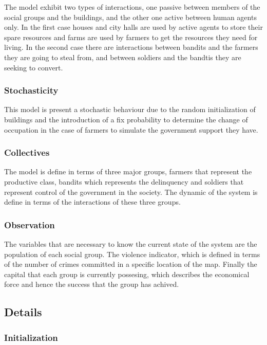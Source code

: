 \documentclass{wscpaperproc}
\begin{document}
The model exhibit two types of interactions, one passive between members of the
social groups and the buildings, and the other one active between human agents
only. In the first case houses and city halls are used by active agents to
store their spare resources and farms are used by farmers to get the resources
they need for living. In the second case there are interactions between
bandits and the farmers they are going to steal from, and between soldiers and
the bandtis they are seeking to convert.

\subsubsection{Stochasticity}

This model is present a stochastic behaviour due to the random initialization of
buildings and the introduction of a fix probability to determine the change of
occupation in the case of farmers to simulate the government support they have.

\subsubsection{Collectives}

The model is define in terms of three major groups, farmers that represent
the productive class, bandits which represents the delinquency and soldiers
that represent control of the government in the society. The dynamic of the
system is define in terms of the interactions of these three groups.

\subsubsection{Observation}

The variables that are necessary to know the current state of the system are
the population of each social group. The violence indicator, which is defined
in terms of the number of crimes committed in a specific location of the map.
Finally the capital that each group is currently possesing, which describes the
economical force and hence the success that the group has achived.

\subsection{Details}

\subsubsection{Initialization}
\end{document}
